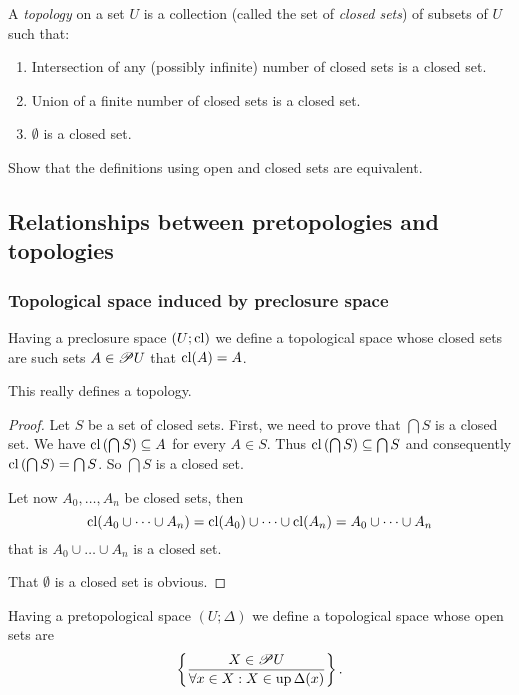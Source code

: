 A \emph{topology} on a set $U$ is a collection (called the set of
\emph{closed sets}) of subsets of $U$ such that:
\begin{enumerate}
\item Intersection of any (possibly infinite) number of closed sets is a
closed set.
\item Union of a finite number of closed sets is a closed set.
\item $\emptyset$ is a closed set.\end{enumerate}
\begin{xca}
Show that the definitions using open and closed sets are equivalent.
\end{xca}

\subsection{Relationships between pretopologies and topologies}


\subsubsection{Topological space induced by preclosure space}

Having a preclosure
space $(U;\operatorname{cl})$ we define a topological space whose closed sets are
such sets $A\in\mathscr{P} U$ that $\operatorname{cl}(A)=A$.
\begin{prop}
This really defines a topology.\end{prop}
\begin{proof}
Let $S$ be a set of closed sets. First, we need to prove that $\bigcap S$
is a closed set. We have $\operatorname{cl}\left(\bigcap S\right)\subseteq A$ for
every $A\in S$. Thus $\operatorname{cl}\left(\bigcap S\right)\subseteq\bigcap S$
and consequently $\operatorname{cl}\left(\bigcap S\right)=\bigcap S$. So $\bigcap S$
is a closed set.

Let now $A_{0},\dots,A_{n}$ be closed sets, then
\[
\operatorname{cl}(A_{0}\cup\dots\cup A_{n})=\operatorname{cl}(A_{0})\cup\dots\cup\operatorname{cl}(A_{n})=A_{0}\cup\dots\cup A_{n}
\]
that is $A_{0}\cup\dots\cup A_{n}$ is a closed set.

That $\emptyset$ is a closed set is obvious.
\end{proof}
Having a pretopological space $(U;\Delta)$ we define a topological
space whose open sets are
\[
\left\{ \frac{X\in\mathscr{P} U}{\forall x\in X:X\in\operatorname{up}\Delta(x)}\right\}.
\]

